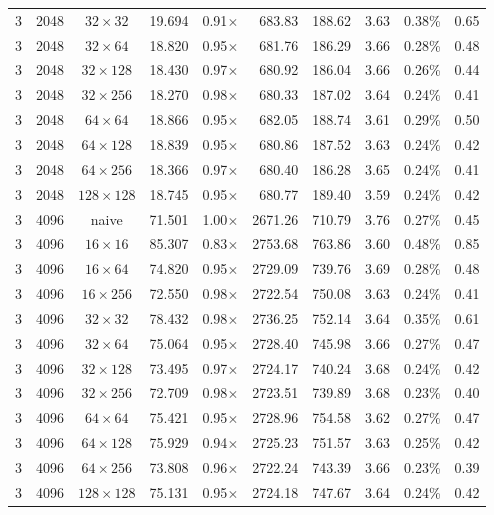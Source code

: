 \documentclass[11pt,a4paper]{article}
\begin{document}
{\begin{longtable}{rrcrrrrrrr}
3 & 2048 & $32\times 32$ & 19.694 & 0.91$\times$ & 683.83 & 188.62 & 3.63 & 0.38\% & 0.65 \\
3 & 2048 & $32\times 64$ & 18.820 & 0.95$\times$ & 681.76 & 186.29 & 3.66 & 0.28\% & 0.48 \\
3 & 2048 & $32\times 128$ & 18.430 & 0.97$\times$ & 680.92 & 186.04 & 3.66 & 0.26\% & 0.44 \\
3 & 2048 & $32\times 256$ & 18.270 & 0.98$\times$ & 680.33 & 187.02 & 3.64 & 0.24\% & 0.41 \\
3 & 2048 & $64\times 64$ & 18.866 & 0.95$\times$ & 682.05 & 188.74 & 3.61 & 0.29\% & 0.50 \\
3 & 2048 & $64\times 128$ & 18.839 & 0.95$\times$ & 680.86 & 187.52 & 3.63 & 0.24\% & 0.42 \\
3 & 2048 & $64\times 256$ & 18.366 & 0.97$\times$ & 680.40 & 186.28 & 3.65 & 0.24\% & 0.41 \\
3 & 2048 & $128\times 128$ & 18.745 & 0.95$\times$ & 680.77 & 189.40 & 3.59 & 0.24\% & 0.42 \\
\midrule
3 & 4096 & naive & 71.501 & 1.00$\times$ & 2671.26 & 710.79 & 3.76 & 0.27\% & 0.45 \\
3 & 4096 & $16\times 16$ & 85.307 & 0.83$\times$ & 2753.68 & 763.86 & 3.60 & 0.48\% & 0.85 \\
3 & 4096 & $16\times 64$ & 74.820 & 0.95$\times$ & 2729.09 & 739.76 & 3.69 & 0.28\% & 0.48 \\
3 & 4096 & $16\times 256$ & 72.550 & 0.98$\times$ & 2722.54 & 750.08 & 3.63 & 0.24\% & 0.41 \\
3 & 4096 & $32\times 32$ & 78.432 & 0.98$\times$ & 2736.25 & 752.14 & 3.64 & 0.35\% & 0.61 \\
3 & 4096 & $32\times 64$ & 75.064 & 0.95$\times$ & 2728.40 & 745.98 & 3.66 & 0.27\% & 0.47 \\
3 & 4096 & $32\times 128$ & 73.495 & 0.97$\times$ & 2724.17 & 740.24 & 3.68 & 0.24\% & 0.42 \\
3 & 4096 & $32\times 256$ & 72.709 & 0.98$\times$ & 2723.51 & 739.89 & 3.68 & 0.23\% & 0.40 \\
3 & 4096 & $64\times 64$ & 75.421 & 0.95$\times$ & 2728.96 & 754.58 & 3.62 & 0.27\% & 0.47 \\
3 & 4096 & $64\times 128$ & 75.929 & 0.94$\times$ & 2725.23 & 751.57 & 3.63 & 0.25\% & 0.42 \\
3 & 4096 & $64\times 256$ & 73.808 & 0.96$\times$ & 2722.24 & 743.39 & 3.66 & 0.23\% & 0.39 \\
3 & 4096 & $128\times 128$ & 75.131 & 0.95$\times$ & 2724.18 & 747.67 & 3.64 & 0.24\% & 0.42 \\

\end{longtable}}
\end{document}
